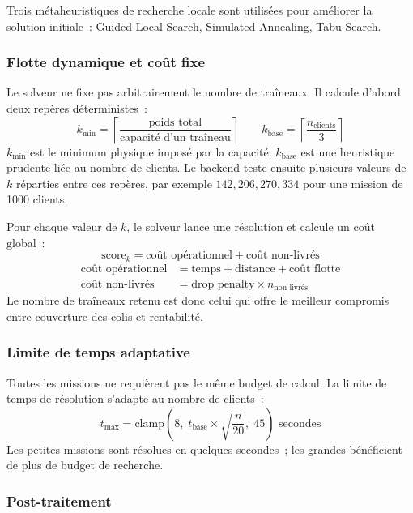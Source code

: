 \documentclass[a4paper, 12pt, twoside]{article}
\begin{document}
Trois m\'{e}taheuristiques de recherche locale sont utilis\'{e}es pour am\'{e}liorer la solution
initiale~: Guided Local Search, Simulated Annealing, Tabu Search.

\subsubsection{Flotte dynamique et co\^{u}t fixe}

Le solveur ne fixe pas arbitrairement le nombre de tra\^{i}neaux. Il calcule d'abord
deux rep\`{e}res d\'{e}terministes~:
\[
  k_{\min} = \left\lceil \frac{\text{poids total}}{\text{capacit\'{e} d'un tra\^{i}neau}} \right\rceil
  \qquad
  k_{\text{base}} = \left\lceil \frac{n_{\text{clients}}}{3} \right\rceil
\]
$k_{\min}$ est le minimum physique impos\'{e} par la capacit\'{e}. $k_{\text{base}}$
est une heuristique prudente li\'{e}e au nombre de clients. Le backend teste ensuite
plusieurs valeurs de $k$ r\'{e}parties entre ces rep\`{e}res, par exemple
$142, 206, 270, 334$ pour une mission de 1000 clients.

Pour chaque valeur de $k$, le solveur lance une r\'{e}solution et calcule un co\^{u}t
global~:
\[
  \text{score}_{k} = \text{co\^{u}t op\'{e}rationnel} + \text{co\^{u}t non-livr\'{e}s}
\]
\begin{align*}
  \text{co\^{u}t op\'{e}rationnel}
    &= \text{temps} + \text{distance} + \text{co\^{u}t flotte} \\
  \text{co\^{u}t non-livr\'{e}s}
    &= \text{drop\_penalty} \times n_{\text{non livr\'{e}s}}
\end{align*}
Le nombre de tra\^{i}neaux retenu est donc celui qui offre le meilleur compromis
entre couverture des colis et rentabilit\'{e}.

\subsubsection{Limite de temps adaptative}

Toutes les missions ne requi\`{e}rent pas le m\^{e}me budget de calcul. La limite de temps
de r\'{e}solution s'adapte au nombre de clients~:
\[
  t_{\max} = \text{clamp}\!\left(8,\; t_{\text{base}} \times \sqrt{\frac{n}{20}},\; 45\right)
  \text{ secondes}
\]
Les petites missions sont r\'{e}solues en quelques secondes~; les grandes bénéficient de
plus de budget de recherche.

\subsubsection{Post-traitement}
\end{document}
